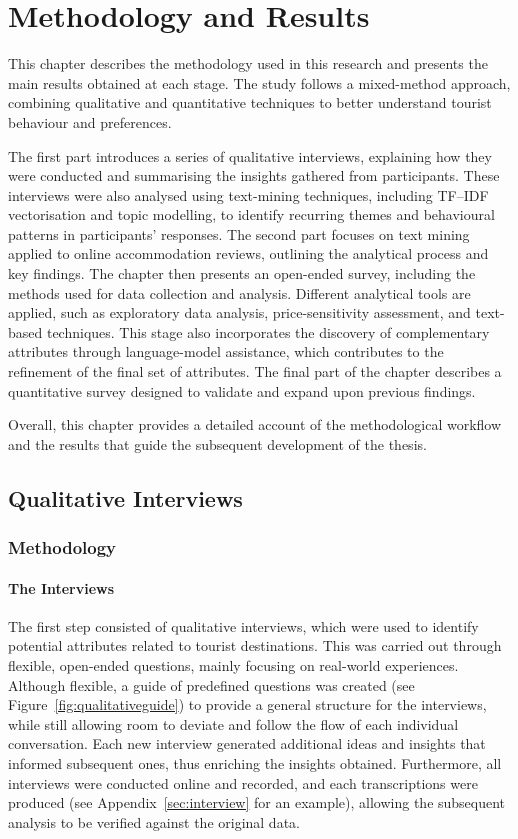 \documentclass[a4paper, 12pt, twoside]{report}  %
\begin{document}
\chapter{Methodology and Results}

\indent This chapter describes the methodology used in this research and presents the main results obtained at each stage. The study follows a mixed-method  approach, combining qualitative and quantitative techniques to better understand tourist behaviour and preferences.

\indent The first part introduces a series of qualitative interviews, explaining how they were conducted and summarising the insights gathered from participants. These interviews were also analysed using text-mining techniques, including TF–IDF vectorisation and topic modelling, to identify recurring themes and behavioural patterns in participants’ responses. The second part focuses on text mining applied to online accommodation reviews, outlining the analytical process and key findings. The chapter then presents an open-ended survey, including the methods used for data collection and analysis. Different analytical tools are applied, such as exploratory data analysis, price-sensitivity assessment, and text-based techniques. This stage also incorporates the discovery of complementary attributes through language-model assistance, which contributes to the refinement of the final set of attributes. The final part of the chapter describes a quantitative survey designed to validate and expand upon previous findings.

\indent Overall, this chapter provides a detailed account of the methodological workflow and the results that guide the subsequent development of the thesis.

\section{Qualitative Interviews}

\subsection{Methodology}

\subsubsection{The Interviews}

    \indent The first step consisted of qualitative interviews, which were used to identify potential attributes related to tourist destinations. This was carried out through flexible, open-ended questions, mainly focusing on real-world experiences. Although flexible, a guide of predefined questions was created (see Figure~\ref{fig:qualitativeguide}) to provide a general structure for the interviews, while still allowing room to deviate and follow the flow of each individual conversation. Each new interview generated additional ideas and insights that informed subsequent ones, thus enriching the insights obtained. Furthermore, all interviews were conducted online and recorded, and each transcriptions were produced (see Appendix~\ref{sec:interview} for an example), allowing the subsequent analysis to be verified against the original data.
\end{document}
